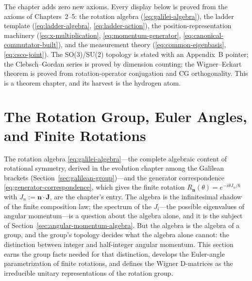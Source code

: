 The chapter adds zero new axioms. Every display below is proved from the axioms of Chapters~2--5: the rotation algebra (\eqref{eq:galilei-algebra}), the ladder template (\eqref{eq:ladder-algebra}, \eqref{eq:ladder-action}), the position-representation machinery (\eqref{eq:x-multiplication}, \eqref{eq:momentum-generator}, \eqref{eq:canonical-commutator-built}), and the measurement theory (\eqref{eq:common-eigenbasis}, \eqref{eq:csco-joint}). The SO(3)/SU(2) topology is stated with an Appendix~B pointer; the Clebsch--Gordan series is proved by dimension counting; the Wigner--Eckart theorem is proved from rotation-operator conjugation and CG orthogonality. This is a theorem chapter, and its harvest is the hydrogen atom.

\section{The Rotation Group, Euler Angles, and Finite Rotations}
\label{sec:rotation-group}

The rotation algebra \eqref{eq:galilei-algebra}---the complete algebraic content of rotational symmetry, derived in the evolution chapter among the Galilean brackets (Section~\ref{sec:galilean-group})---and the generator correspondence \eqref{eq:generator-correspondence}, which gives the finite rotation $R_{\bm n}(\theta)=e^{-i\theta J_n/\hbar}$ with $J_n:=\bm n\cdot\bm J$, are the chapter's entry. The algebra is the infinitesimal shadow of the finite composition law; the spectrum of the $J_i$---the possible eigenvalues of angular momentum---is a question about the algebra alone, and it is the subject of Section~\ref{sec:angular-momentum-algebra}. But the algebra is the algebra of a group, and the group's topology decides what the algebra alone cannot: the distinction between integer and half-integer angular momentum. This section earns the group facts needed for that distinction, develops the Euler-angle parametrization of finite rotations, and defines the Wigner D-matrices as the irreducible unitary representations of the rotation group.

